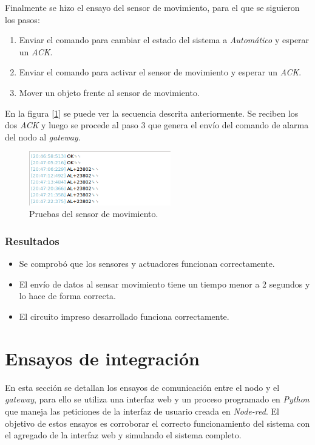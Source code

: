 Finalmente se hizo el ensayo del sensor de movimiento, para el que se siguieron los pasos:

\begin{enumerate}
\item Enviar el comando para cambiar el estado del sistema a {\textit{Automático}} y esperar un {\textit{ACK}}.
\item Enviar el comando para activar el sensor de movimiento y esperar un {\textit{ACK}}.
\item Mover un objeto frente al sensor de movimiento.
\end{enumerate}

En la figura [\ref{fig:sensores2}] se puede ver la secuencia descrita anteriormente. Se reciben los dos {\textit{ACK}} y luego se procede al paso 3 que genera el envío del comando de alarma del nodo al {\textit{gateway}}.

\begin{figure}[h!]
	\centering
	\includegraphics[width=0.55\textwidth]{./Figures/sensores2.png}
	\caption{Pruebas del sensor de movimiento.}
	\label{fig:sensores2}
\end{figure}

\subsubsection{Resultados}

\begin{itemize}
\item Se comprobó que los sensores y actuadores funcionan correctamente.
\item El envío de datos al sensar movimiento tiene un tiempo menor a 2 segundos y lo hace de forma correcta.
\item El circuito impreso desarrollado funciona correctamente.
\end{itemize}


\section{Ensayos de integración}

En esta sección se detallan los ensayos de comunicación entre el nodo y el {\textit{gateway}}, para ello se utiliza una interfaz web y un proceso programado en {\textit{Python}} que maneja las peticiones de la interfaz de usuario creada en {\textit{Node-red}}. El objetivo de estos ensayos es corroborar el correcto funcionamiento del sistema con el agregado de la interfaz web y simulando el sistema completo.

